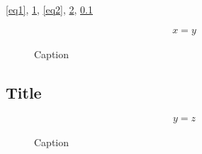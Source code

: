 \documentclass[12pt]{book}
\begin{document}
	\makeatletter
	\makeatother

\ref{eq1}, \ref{fig1}, \ref{eq2}, \ref{fig2}, \ref{sec:xyz}

\begin{figure}[ht]
\begin{align}\label{eq1}
x=y
\end{align}
\caption{Caption}
\label{fig1}
\end{figure}

\subsection{Title}
\label{sec:xyz}

\begin{figure}[ht]
\begin{align}\label{eq2}
y=z
\end{align}
\caption{Caption}
\label{fig2}
\end{figure}
\end{document}
